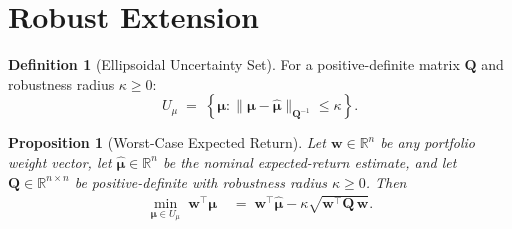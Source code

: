 \documentclass[12pt,openany]{book}
\newcommand{\R}{\mathbb{R}}
\newcommand{\bfw}{\mathbf{w}}
\newcommand{\bfmu}{\boldsymbol{\mu}}
\newcommand{\bfQ}{\mathbf{Q}}
\newcommand{\calU}{\mathcal{U}}
\numberwithin{equation}{chapter}
\theoremstyle{plain}
\newtheorem{proposition}[theorem]{Proposition}
\theoremstyle{definition}
\newtheorem{definition}[theorem]{Definition}
\theoremstyle{remark}
\numberwithin{equation}{chapter}
\theoremstyle{plain}
\def\calU{U}%
\begin{document}
\section{Robust Extension}

\begin{definition}[Ellipsoidal Uncertainty Set]
\label{def:ellipsoidal-uncertainty}
For a positive-definite matrix $\bfQ$ and robustness radius $\kappa \geq 0$:
\begin{equation}
  \calU_\mu \;=\;
  \left\{\bfmu : \|\bfmu - \hat{\bfmu}\|_{\bfQ^{-1}} \leq \kappa\right\}.
  \label{eq:ellipsoidal-set}
\end{equation}
\end{definition}

\begin{proposition}[Worst-Case Expected Return]
\label{prop:robust-return}
Let $\bfw \in \R^n$ be any portfolio weight vector, let
$\hat{\bfmu} \in \R^n$ be the nominal expected-return estimate, and
let $\bfQ \in \R^{n \times n}$ be positive-definite with robustness
radius $\kappa \geq 0$.  Then
\begin{align}
  \min_{\bfmu \in \calU_\mu}\;\bfw^\top\bfmu
  &\;=\;
  \bfw^\top\hat{\bfmu} - \kappa\sqrt{\bfw^\top \bfQ\, \bfw}.
  \label{eq:robust-return}
\end{align}
\end{proposition}
\end{document}
